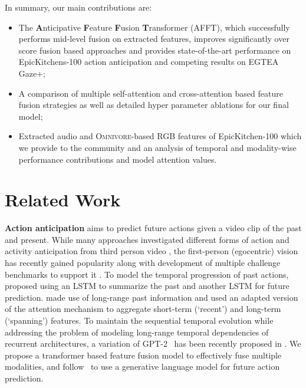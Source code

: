\documentclass[10pt,twocolumn,letterpaper,dvipsnames]{article}
\newcommand{\sname}{AFFT}
\begin{document}
In summary, our main contributions are: 
\begin{itemize}
    \item The \textbf{A}nticipative \textbf{F}eature \textbf{F}usion \textbf{T}ransformer (\sname), which successfully performs mid-level fusion on extracted features, improves significantly over score fusion based approaches and provides state-of-the-art performance on EpicKitchens-100 action anticipation and competing results on EGTEA Gaze+;
    \item A comparison of multiple self-attention and cross-attention based feature fusion strategies as well as detailed hyper parameter ablations for our final model;
    \item Extracted audio and \textsc{Omnivore}-based RGB features of EpicKitchen-100 which we provide to the community and an analysis of temporal and modality-wise performance contributions and model attention values.
\end{itemize} \section{Related Work}
\textbf{Action anticipation} aims to predict future actions given a video clip of the past and present. While many approaches investigated different forms of action and activity anticipation from third person video \cite{gaoREDReinforcedEncoderDecoder2017,farhaWhenWillYou2018,keTimeConditionedActionAnticipation2019,gongFutureTransformerLongterm2022}, the first-person (egocentric) vision has recently gained popularity along with development of multiple challenge benchmarks to support it \cite{damen2018scaling,damen2020epic,li2018eye}. To model the temporal progression of past actions, \cite{furnariWhatWouldYou2019} proposed using an LSTM
to summarize the past and another LSTM for future prediction. \cite{senerTemporalAggregateRepresentations2020} made use of long-range past information and used an adapted version of the attention mechanism to aggregate short-term (`recent') and long-term (`spanning') features. To maintain the sequential temporal evolution while addressing the problem of modeling long-range temporal dependencies of recurrent architectures, a variation of GPT-2~\cite{radford2019language} has been recently proposed in \cite{girdharAnticipativeVideoTransformer2021}. We propose a transformer based feature fusion model to effectively fuse multiple modalities, and follow~\cite{girdharAnticipativeVideoTransformer2021} to use a generative language model for future action prediction.
\end{document}
